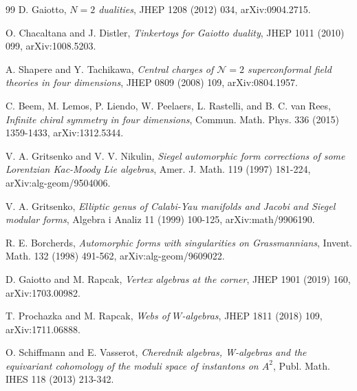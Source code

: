 \documentclass[11pt]{article}
\providecommand{\Ntwo}{\mathcal{N}{=}2}
\begin{document}
\begin{thebibliography}{99}
D. Gaiotto, \emph{\(N=2\) dualities}, JHEP 1208 (2012) 034,
arXiv:0904.2715.

O. Chacaltana and J. Distler, \emph{Tinkertoys for Gaiotto duality},
JHEP 1011 (2010) 099, arXiv:1008.5203.

A. Shapere and Y. Tachikawa, \emph{Central charges of
\(\Ntwo\) superconformal field theories in four dimensions},
JHEP 0809 (2008) 109, arXiv:0804.1957.

C. Beem, M. Lemos, P. Liendo, W. Peelaers, L. Rastelli, and
B. C. van Rees, \emph{Infinite chiral symmetry in four dimensions},
Commun. Math. Phys. 336 (2015) 1359-1433, arXiv:1312.5344.

V. A. Gritsenko and V. V. Nikulin, \emph{Siegel automorphic form
corrections of some Lorentzian Kac-Moody Lie algebras},
Amer. J. Math. 119 (1997) 181-224, arXiv:alg-geom/9504006.

V. A. Gritsenko, \emph{Elliptic genus of Calabi-Yau manifolds and
Jacobi and Siegel modular forms}, Algebra i Analiz 11 (1999) 100-125,
arXiv:math/9906190.

R. E. Borcherds, \emph{Automorphic forms with singularities on
Grassmannians}, Invent. Math. 132 (1998) 491-562,
arXiv:alg-geom/9609022.

D. Gaiotto and M. Rapcak, \emph{Vertex algebras at the corner},
JHEP 1901 (2019) 160, arXiv:1703.00982.

T. Prochazka and M. Rapcak, \emph{Webs of \(W\)-algebras},
JHEP 1811 (2018) 109, arXiv:1711.06888.

O. Schiffmann and E. Vasserot, \emph{Cherednik algebras, W-algebras
and the equivariant cohomology of the moduli space of instantons on
\(A^2\)}, Publ. Math. IHES 118 (2013) 213-342.
\end{thebibliography}
\end{document}
